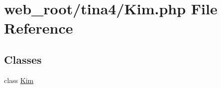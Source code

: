 \hypertarget{Kim_8php}{}\section{web\+\_\+root/tina4/\+Kim.php File Reference}
\label{Kim_8php}
\subsection*{Classes}
\begin{DoxyCompactItemize}
\item 
class \hyperlink{classKim}{Kim}
\end{DoxyCompactItemize}
